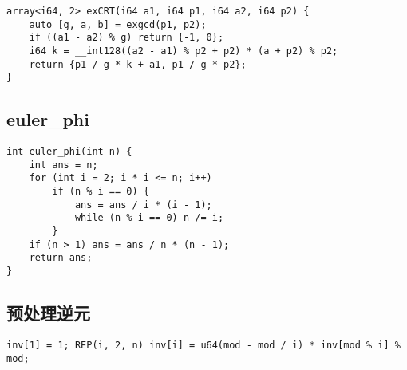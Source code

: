 \documentclass[a4paper,landscape,twocolumn]{ctexart}
\begin{document}
\begin{lstlisting}
array<i64, 2> exCRT(i64 a1, i64 p1, i64 a2, i64 p2) {
	auto [g, a, b] = exgcd(p1, p2);
	if ((a1 - a2) % g) return {-1, 0};
	i64 k = __int128((a2 - a1) % p2 + p2) * (a + p2) % p2;
	return {p1 / g * k + a1, p1 / g * p2};
}
\end{lstlisting}

\subsection{euler\_phi}

\begin{lstlisting}[]
int euler_phi(int n) {
	int ans = n;
	for (int i = 2; i * i <= n; i++)
		if (n % i == 0) {
			ans = ans / i * (i - 1);
			while (n % i == 0) n /= i;
		}
	if (n > 1) ans = ans / n * (n - 1);
	return ans;
}
\end{lstlisting}

\subsection{预处理逆元}

\begin{lstlisting}[]
inv[1] = 1; REP(i, 2, n) inv[i] = u64(mod - mod / i) * inv[mod % i] % mod;
\end{lstlisting}

%

%
\end{document}

